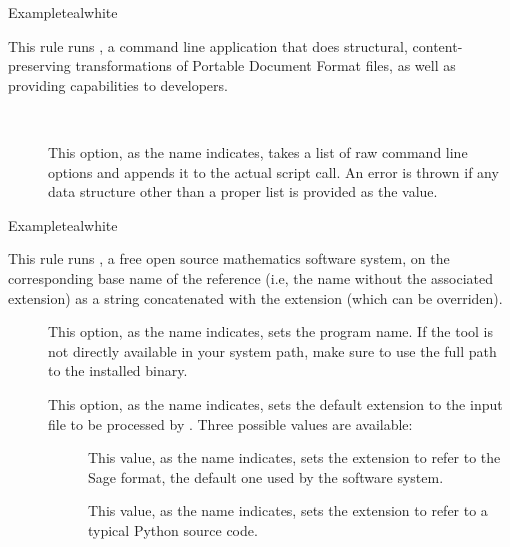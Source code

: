 \begin{description}
\begin{codebox}{Example}{teal}{\icnote}{white}
\end{codebox}

\item[\rulebox{qpdf}]
This rule runs , a command line application that does structural, content-preserving transformations of Portable Document Format files, as well as providing capabilities to developers.

\begin{description}
\item[~\rqbox] This option, as the name indicates, takes a list of raw command line options and appends it to the actual script call. An error is thrown if any data structure other than a proper list is provided as the value.
\end{description}

\begin{codebox}{Example}{teal}{\icnote}{white}
\end{codebox}

\item[\rulebox{sage}]
This rule runs , a free open source mathematics software system, on the corresponding base name of the  reference (i.e, the name without the associated extension) as a string concatenated with the  extension (which can be overriden).

\begin{description}
\item[] This option, as the name indicates, sets the program name. If the tool is not directly available in your system path, make sure to use the full path to the installed  binary.

\item[] This option, as the name indicates, sets the default extension to the input file to be processed by . Three possible values are available:

\begin{description}
\item[] This value, as the name indicates, sets the extension to refer to the Sage format, the default one used by the software system.

\item[] This value, as the name indicates, sets the extension to refer to a typical Python source code.


\end{description}
\end{description}
\end{description}
